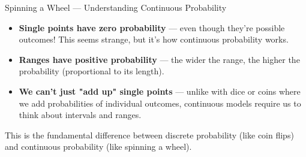 \begin{exampleboxbreak}{Spinning a Wheel — Understanding Continuous Probability}
\begin{itemize}
  \item \textbf{Single points have zero probability} — even though they're possible outcomes! This seems strange, but it's how continuous probability works.

  \item \textbf{Ranges have positive probability} — the wider the range, the higher the probability (proportional to its length).

  \item \textbf{We can't just "add up" single points} — unlike with dice or coins where we add probabilities of individual outcomes, continuous models require us to think about intervals and ranges.
\end{itemize}

This is the fundamental difference between discrete probability (like coin flips) and continuous probability (like spinning a wheel).
\end{exampleboxbreak}

